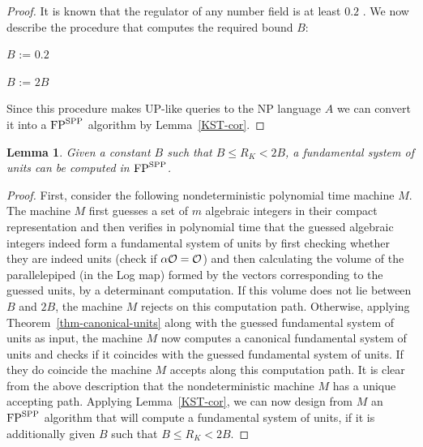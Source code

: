 \documentclass{article}
\newcommand{\FP}{{\rm FP}}
\newcommand{\SPP}{{\rm SPP}}
\newtheorem{lemma}[theorem]{Lemma}
\theoremstyle{definition}\newtheorem{remark}[theorem]{Remark}
\begin{document}
\begin{proof}
It is known that the regulator of any number field is at least $0.2$
\cite{cohen:1993}. We now describe the procedure that computes the
required bound $B$:

\begin{algorithm}
\vspace{-5mm}

  
  $B$ := $0.2$\;
  
  \While{\KwTrue}
  {
    $B$ := $2B$\;
  }
\end{algorithm}

Since this procedure makes UP-like queries to the NP language $A$ we
can convert it into a $\FP^{\SPP}$ algorithm by Lemma~\ref{KST-cor}.
\end{proof}

\begin{lemma}\label{stage-two}
  Given a constant $B$ such that $B \leq R_K < 2B$, a fundamental
  system of units can be computed in $\FP^{\SPP}$.
\end{lemma}
\begin{proof}
  First, consider the following nondeterministic polynomial time
  machine $M$. The machine $M$ first guesses a set of $m$ algebraic
  integers in their compact representation and then verifies in
  polynomial time that the guessed algebraic integers indeed form a
  fundamental system of units by first checking whether they are
  indeed units (check if $\alpha \cal{O} = \cal{O}$) and then
  calculating the volume of the parallelepiped (in the Log map) formed
  by the vectors corresponding to the guessed units, by a determinant
  computation. If this volume does not lie between $B$ and $2B$, the
  machine $M$ rejects on this computation path. Otherwise, applying
  Theorem~\ref{thm-canonical-units} along with the guessed fundamental
  system of units as input, the machine $M$ now computes a canonical
  fundamental system of units and checks if it coincides with the
  guessed fundamental system of units. If they do coincide the machine
  $M$ accepts along this computation path. It is clear from the above
  description that the nondeterministic machine $M$ has a unique
  accepting path. Applying Lemma~\ref{KST-cor}, we can now design from
  $M$ an $\FP^{\SPP}$ algorithm that will compute a fundamental system
  of units, if it is additionally given $B$ such that $B \leq R_K <
  2B$.
\end{proof}
    
\end{document}
